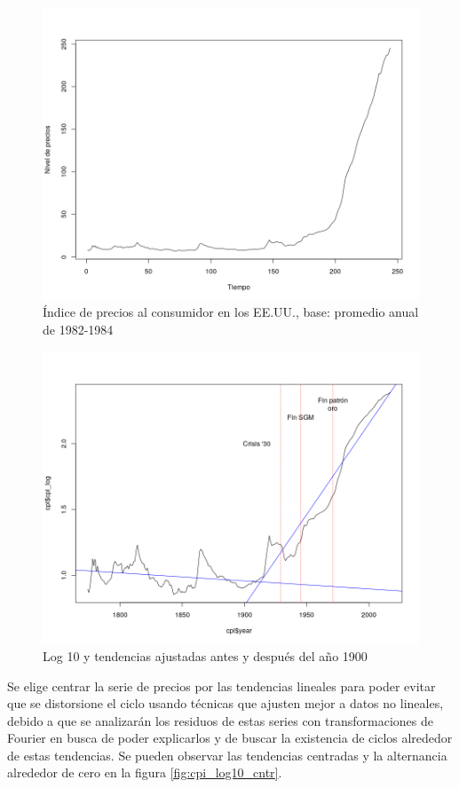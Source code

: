 \documentclass[a4paper]{article}
\begin{document}
\begin{figure}[H]
	\centering
	\includegraphics[width=0.8\linewidth]{cpi_orig.png}
	\caption{Índice de precios al consumidor en los EE.UU., base: promedio anual de 1982-1984} 	
	\label{fig:cpi_orig}
\end{figure}

\begin{figure}[H]
	\centering
	\includegraphics[width=0.8\linewidth]{cpi_log10_tend.png}
	\caption{Log 10 y tendencias ajustadas antes y después del año 1900} 	
	\label{fig:cpi_log10_tend}
\end{figure}

Se elige centrar la serie de precios por las tendencias lineales para poder evitar que se distorsione el ciclo usando técnicas que ajusten mejor a datos no lineales, debido a que se analizarán los residuos de estas series con transformaciones de Fourier en busca de poder explicarlos y de buscar la existencia de ciclos alrededor de estas tendencias. Se pueden observar las tendencias centradas y la alternancia alrededor de cero en la figura \ref{fig:cpi_log10_cntr}.
\end{document}
